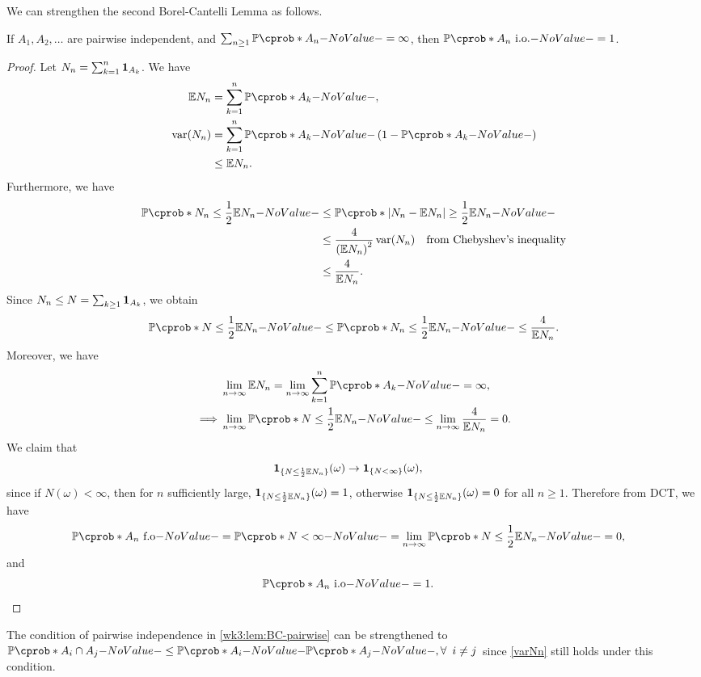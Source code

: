 \documentclass[12pt]{article}
\begin{document}
We can strengthen the second Borel-Cantelli Lemma as follows.
\begin{Lemma}\label{wk3:lem:BC-pairwise}
If $A_1, A_2, \ldots$ are pairwise independent, and $\sum_{n \geq 1} \P(A_n) = \infty$, then $\P(A_n \io) = 1$.
\end{Lemma}
\begin{proof}
Let $N_n = \sum_{k=1}^{n} {\bf 1}_{A_k}$. We have
\begin{align}
\E N_n 
&= \sum_{k=1}^n \P(A_k), \nn
\var(N_n) 
&= \sum_{k=1}^n\P(A_k)\left(1-\P(A_k)\right) \nn
&\leq \E N_n.\label{varNn}
\end{align}
Furthermore, we have
\begin{align*}
\P(N_n \leq \frac{1}{2}\E N_n) 
&\leq \P(|N_n - \E N_n| \geq \frac{1}{2} \E N_n) \\
&\leq \frac{4}{\left(\E N_n\right)^2} \var(N_n) \quad \text{from Chebyshev's inequality} \\
&\leq \frac{4}{\E N_n}.
\end{align*}
Since $N_n \leq N =\sum_{k\geq1} {\bf 1}_{A_k}$, we obtain
\begin{align*}
\P(N \leq \frac{1}{2}\E N_n) 
\leq \P(N_n \leq \frac{1}{2}\E N_n)
\leq \frac{4}{\E N_n}.
\end{align*}
Moreover, we have
\begin{align*}
&\lim_{n \to \infty} \E N_n = \lim_{n \to \infty} \sum_{k=1}^n \P(A_k) = \infty, \\
\implies
&\lim_{n \to \infty} \P(N \leq \frac{1}{2}\E N_n) \leq \lim_{n \to \infty} \frac{4}{\E N_n} = 0.
\end{align*}
We claim that
\begin{align*}
&\indicatore{\{N \leq \frac{1}{2} \E N_n\}}(\omega) \to \indicatore{\{N <\infty\}}(\omega),
\end{align*}
since if $N(\omega)<\infty$, then for $n$ sufficiently large, $\indicatore{\{N \leq \frac{1}{2} \E N_n\}}(\omega)=1$, otherwise $\indicatore{\{N \leq \frac{1}{2} \E N_n\}}(\omega)=0$ for all $n\geq 1$. Therefore from DCT, we have
\begin{align*}
&\P(A_n \ \text{f.o}) = \P(N < \infty) = \lim_{n \to \infty} \P(N \leq \frac{1}{2} \E N_n) = 0, 
\end{align*}
and
\begin{align*}
&\P(A_n \ \text{i.o}) = 1.
\end{align*}
\end{proof}
%
\begin{Remark}
The condition of pairwise independence in \cref{wk3:lem:BC-pairwise} can be strengthened to $\P(A_i \cap A_j) \leq \P(A_i)\P(A_j), \forall\ i \neq j$ since \cref{varNn} still holds under this condition.
\end{Remark}
\end{document}
